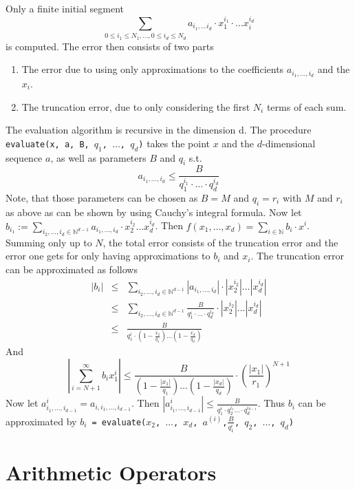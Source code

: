 \documentclass[]{article}
\newcommand{\NN}{\mathbb N}
\newcommand{\abs}[1]{\left|#1\right|}
\newcommand{\code}{\texttt}
\begin{document}
Only a finite initial segment
$$ \sum_{0 \leq i_1 \leq N_1, \dots, 0 \leq i_d \leq N_d } a_{i_1, \dots i_d} \cdot x_1^{i_1} \cdot \dots x_i^{i_d} $$
is computed.
The error then consists of two parts
\begin{enumerate}
  \item The error due to using only approximations to the coefficients $a_{i_1, \dots, i_d}$ and the $x_i$.
  \item The truncation error, due to only considering the first $N_i$ terms of each sum.
\end{enumerate}
The evaluation algorithm is recursive in the dimension d.
The procedure \code{evaluate(x, a, B, $q_1$, $\dots$, $q_d$)} takes the point $x$ and the $d$-dimensional sequence $a$, as well as parameters $B$ and $q_i$ s.t.
$$ a_{i_1, \dots, i_d} \leq \frac{B}{q_1^{i_1} \cdot \dots \cdot q_d^{i_d}} $$
Note, that those parameters can be chosen as $B=M$ and $q_i = r_i$ with $M$ and $r_i$ as above as can be shown by using Cauchy's integral formula.
Now let $b_{i_1} := \sum_{i_2, \dots, i_d \in \NN^{d-1}} a_{i_1, \dots, i_d} \cdot x_2^{i_2} \dots x_d^{i_d}$.
Then $f(x_1, \dots, x_d) = \sum_{i \in \NN} b_i\cdot x^i$.
Summing only up to $N$, the total error consists of the truncation error and the error one gets for only having approximations to $b_i$ and $x_i$.
The truncation error can be approximated as follows
\begin{eqnarray*}
\abs{b_i} &\leq& \sum_{i_2, \dots, i_d \in \NN^{d-1}} \abs{a_{i_1, \dots, i_d}} \cdot \abs{x_2^{i_2}} \dots \abs{x_d^{i_d}} \\
&\leq& \sum_{i_2, \dots, i_d \in \NN^{d-1}} \frac{B}{q_1^{i} \cdot \dots \cdot q_d^{i_d}} \cdot \abs{x_2^{i_2}} \dots \abs{x_d^{i_d}} \\
&\leq& \frac{B}{q_1^i \cdot (1-\frac{x_2}{q_1}) \dots (1-\frac{x_d}{q_d})}
\end{eqnarray*}
And
$$ \abs{ \sum_{i=N+1}^\infty b_i x_1^i } \leq \frac{B}{(1-\frac{\abs{x_1}}{q_1}) \dots (1-\frac{\abs{x_d}}{q_d}) }\cdot \left(\frac{\abs{x_1}}{r_1} \right)^{N+1} $$
Now let $a^{i}_{i_1, \dots, i_{d-1}} = a_{i, i_1, \dots, i_{d-1}}$.
Then $\abs{a^{i}_{i_1, \dots, i_{d-1}}} \leq \frac{B}{q_1^{i} \cdot q_2^{i_1} \dots \cdot q_d^{i_{d-1}}}$.
Thus $b_i$ can be approximated by \code{$b_i$ = evaluate($x_2$, $\dots$, $x_d$, $a^{(i)}$,$\frac{B}{q_1^i}$, $q_2$, $\dots$, $q_d$)}
\section{Arithmetic Operators}
\end{document}
